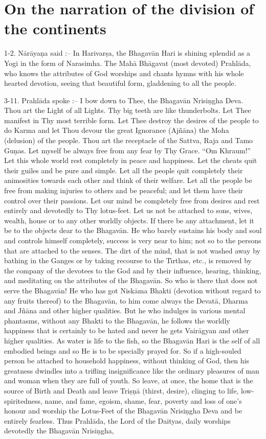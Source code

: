 \chapter{On the narration of the division of the continents}

1-2. N\=ar\=aya\d{n}a said :-- In Harivar\d{s}a, the Bhagav\=an Hari is shining splendid as a Yogi in the form of Narasimha. The Mah\=a Bh\=agavat (most devoted) Prahl\=ada, who knows the attributes of God worships and chants hymns with his whole hearted devotion, seeing that beautiful form, gladdening to all the people.

3-11. Prahl\=ada spoke :-- I bow down to Thee, the Bhagav\=an Nrisi\d{n}gha Deva. Thou art the Light of all Lights. Thy big teeth are like thunderbolts. Let Thee manifest in Thy most terrible form. Let Thee destroy the desires of the people to do Karma and let Thou devour the great Ignorance (Aj\~n\=ana) the Moha (delusion) of the people. Thou art the receptacle of the Sattva, Raja and Tamo Gu\d{n}as. Let myself be always free from any fear by Thy Grace. ``Om Khraum!'' Let this whole world rest completely in peace and happiness. Let the cheats quit their guiles and be pure and simple. Let all the people quit completely their animosities towards each other and think of their welfare. Let all the people be free from making injuries to others and be peaceful; and let them have their control over their passions. Let our mind be completely free from desires and rest entirely and devotedly to Thy lotus-feet. Let us not be attached to sons, wives, wealth, house or to any other worldly objects. If there be any attachment, let it be to the objects dear to the Bhagav\=an. He who barely sustains his body and soul and controls himself completely, success is very near to him; not so to the persons that are attached to the senses. The dirt of the mind, that is not washed away by bathing in the Ganges or by taking recourse to the T\={\i}rthas, etc., is removed by the company of the devotees to the God and by their influence, hearing, thinking, and meditating on the attributes of the Bhagav\=an. So who is there that does not serve the Bhagav\=an! He who has got Nisk\=ama Bhakti (devotion without regard to any fruits thereof) to the Bhagav\=an, to him come always the Devat\=a, Dharma and J\~n\=ana and other higher qualities. But he who indulges in various mental phantasms, without any Bhakti to the Bhagav\=an, he follows the worldly happiness that is certainly to be hated and never he gets Vair\=agyan and other higher qualities. As water is life to the fish, so the Bhagav\=an Hari is the self of all embodied beings and so He is to be specially prayed for. So if a high-souled person be attached to household happiness, without thinking of God, then his greatness dwindles into a trifling insignificance like the ordinary pleasures of man and woman when they are full of youth. So leave, at once, the home that is the source of Birth and Death and leave Tri\d{s}\d{n}\=a (thirst, desire), clinging to life, low-spiritedness, name, and fame, egoism, shame, fear, poverty and loss of one's honour and worship the Lotus-Feet of the Bhagav\=an Nrisi\d{n}gha Deva and be entirely fearless. Thus Prahl\=ada, the Lord of the Daityas, daily worships devotedly the Bhagav\=an Nrisi\d{n}gha, 